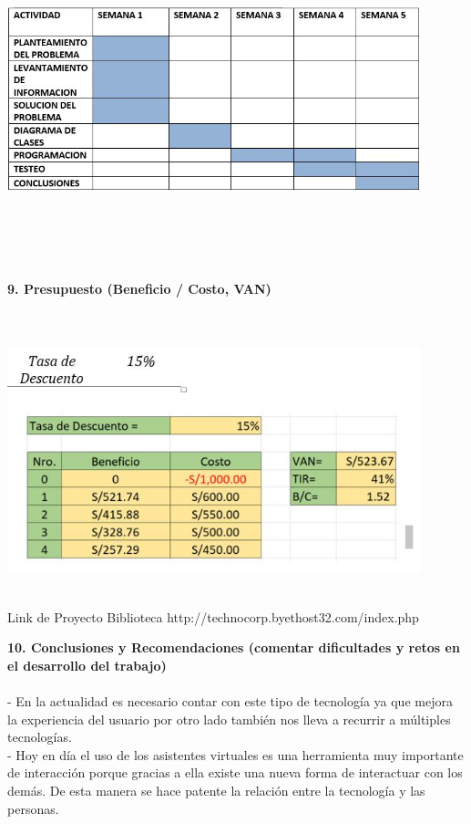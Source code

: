 \begin{flushleft}
\begin{itemize}
\textbf{ }\\
\begin{center}
	\includegraphics[width=12cm]{./Imagenes/bot1} 
	\end{center}
\textbf{ }\\
\textbf{ }\\
\textbf{ }\\
\textbf{ }\\
\textbf{9.      Presupuesto (Beneficio / Costo, VAN) }\\
\textbf{ }\\
\textbf{ }\\
\begin{center}
	\includegraphics[width=12cm]{./Imagenes/bot2} 
	\end{center}
\textbf{ }\\
Link de Proyecto Biblioteca
http://technocorp.byethost32.com/index.php

\textbf{10.  Conclusiones y Recomendaciones (comentar dificultades y retos en el desarrollo del trabajo)}\\
\textbf{ }\\
-	En la actualidad es necesario contar con este tipo de tecnología ya que mejora la experiencia del usuario por otro lado también nos lleva a recurrir a múltiples tecnologías.\textbf{ }\\
-	Hoy en día el uso de los asistentes virtuales es una herramienta muy importante de interacción porque gracias a ella existe una nueva forma de interactuar con los demás. De esta manera se hace patente la relación entre la tecnología y las personas.\textbf{ }\\


\end{itemize} 


\end{flushleft}

